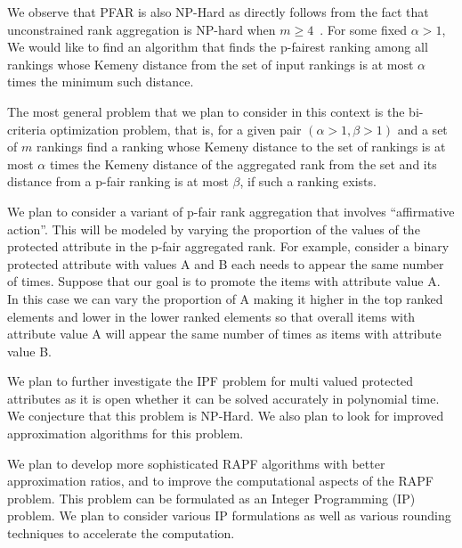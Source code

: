 \documentclass[11pt]{article}
\begin{document}
We observe that PFAR is also NP-Hard as directly follows from the fact that unconstrained rank aggregation is NP-hard when 
$m\ge 4$~\cite{ailon2008aggregating}. For some fixed $\alpha > 1$, We would like to find an algorithm that finds the p-fairest ranking among all rankings whose Kemeny distance from the set of input rankings is at most $\alpha$ times the minimum such distance. 

\smallskip {} 
The most general problem that we plan to consider in this context is the bi-criteria optimization problem, that is, for a given pair $(\alpha>1 ,\beta>1)$ and a set of $m$ rankings %
find a ranking whose Kemeny distance to the set of rankings is at most $\alpha$ times the Kemeny distance of the aggregated rank from the set and its distance from a p-fair ranking is at most $\beta$, if such a ranking exists.

\smallskip {} 
We plan to consider a variant of p-fair rank aggregation that involves ``affirmative action''. This will be modeled by varying the proportion of the values of the protected attribute in the p-fair aggregated rank. For example, consider a binary protected attribute with values A and B each needs to appear the same number of times. Suppose that our goal is to promote the items with attribute value A. In this case we can vary the proportion of A making it higher in the top ranked elements and lower in the lower ranked elements so that overall items with attribute value A will appear the same number of times as items with attribute value B.

\smallskip {}  We plan to further investigate the IPF problem for multi valued protected attributes as it is open whether it can be solved accurately in polynomial time. We conjecture that this problem is NP-Hard. %
We also plan to look for improved approximation algorithms for this problem.

\smallskip {}
We plan to develop more sophisticated RAPF algorithms with better approximation ratios,  %
and to improve the computational aspects of the RAPF problem. This problem can be formulated as an Integer Programming (IP) problem. %
We plan to consider various IP formulations as well as various rounding techniques to accelerate the computation.
\end{document}
